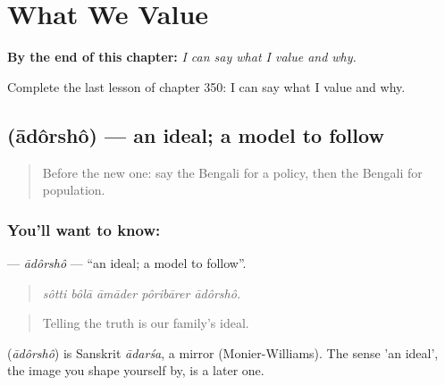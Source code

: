 
\chapter{What We Value}
\label{ch:bn-what-we-value}

\begin{chapteropening}
\textbf{By the end of this chapter:} \emph{I can say what I value and why.}

Complete the last lesson of chapter 350: I can say what I value and why.
\end{chapteropening}

\section[\texorpdfstring{\bn{আদর্শ} (ādôrshô)}{আদর্শ (ādôrshô)}]{ (ādôrshô) — an ideal; a model to follow}

\label{lesson:BN-C350-adorsho}



\begin{quote}
Before the new one: say the Bengali for a policy, then the Bengali for population.
\end{quote}

\subsection*{You'll want to know: }
\textbf{} — \emph{ādôrshô} — \textquotedblleft{}an ideal; a model to follow\textquotedblright{}.

\begin{quote}
    
\end{quote}

\begin{quote}
\emph{sôtti bôlā āmāder pôribārer ādôrshô.}
\end{quote}

\begin{quote}
Telling the truth is our family's ideal.
\end{quote}

\begin{cousinweb}
\textbf{} (\emph{ādôrshô}) is Sanskrit \emph{ādarśa}, a mirror (Monier-Williams). The sense 'an ideal', the image you shape yourself by, is a later one.
\end{cousinweb}

